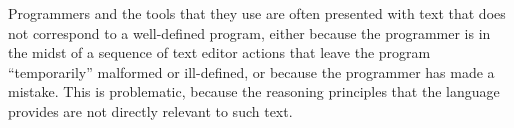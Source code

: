 






Programmers and the tools that they use are often presented with text that does not correspond to a well-defined program, either because the programmer is in the midst of a sequence of
text editor actions that leave the program ``temporarily'' malformed or ill-defined, or because the programmer has made a mistake. This is problematic, because the reasoning principles that the language provides are not directly relevant to such text.%

